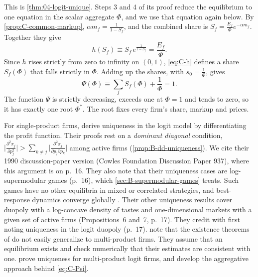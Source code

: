 This is \cref{thm:04-logit-unique}. Steps 3 and 4 of its proof reduce the equilibrium to one equation in the scalar
aggregate $\Phi$, and we use that equation again below. By \cref{prop:C-common-markup}, $\alpha m_f = \frac{1}{1 - S_f}$,
and the combined share is $S_f = \frac{E_f}{\Phi}e^{-\alpha m_f}$. Together they give
\begin{equation}\label{eq:C-h}
  h(S_f) \equiv S_f\,e^{\frac{1}{1 - S_f}} = \frac{E_f}{\Phi} .
\end{equation}
Since $h$ rises strictly from zero to infinity on $(0, 1)$, \eqref{eq:C-h} defines a share $S_f(\Phi)$ that falls
strictly in $\Phi$. Adding up the shares, with $s_0 = \frac{1}{\Phi}$, gives
\begin{equation}\label{eq:C-Psi}
  \Psi(\Phi) \equiv \sum_f S_f(\Phi) + \frac{1}{\Phi} = 1 .
\end{equation}
The function $\Psi$ is strictly decreasing, exceeds one at $\Phi = 1$ and tends to zero, so it has exactly one root
$\Phi^*$. The root fixes every firm's share, markup and prices.

For single-product firms, \citet{CaplinNalebuff1991}
derive uniqueness in the logit model by differentiating the profit function. Their proofs rest on a \emph{dominant diagonal}
condition, $\big\lvert\frac{\partial^2\pi_j}{\partial p_j^2}\big\rvert > \sum_{k \ne j}\big\lvert\frac{\partial^2\pi_j}{\partial
p_j\partial p_k}\big\rvert$ among active firms \citep{Friedman1977} (\cref{prop:B-dd-uniqueness}). We cite their
1990 discussion-paper version (Cowles Foundation Discussion Paper 937), where this argument is on p.~16. They also note
that their uniqueness cases are log-supermodular games (p.~16), which \cref{sec:B-supermodular-games} treats. Such games have no other equilibria in mixed or correlated strategies, and
best-response dynamics converge globally \citep{MilgromRoberts1990}. Their other uniqueness results cover duopoly with a
log-concave density of tastes and one-dimensional markets with a given set of active firms (Propositions~6 and~7,
p.~17). They credit
\citet{AndersonDePalma1988} with first noting uniqueness in the logit duopoly (p.~17). \citet[fn.~12]{BerryLevinsohnPakes1995} note that the existence theorems of
\citet{CaplinNalebuff1991} do not easily generalize to multi-product firms. They assume that an equilibrium exists
and check numerically that their estimates are consistent with one. \citet{KonovalovSandor2010} prove uniqueness
for multi-product logit firms, and \citet{NockeSchutz2018} develop the aggregative approach behind \eqref{eq:C-Psi}.


